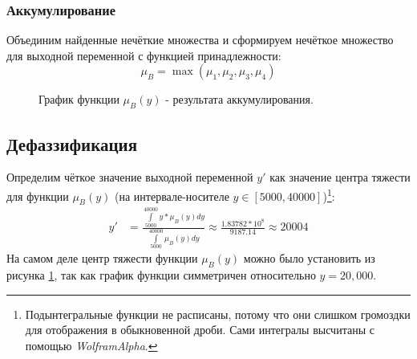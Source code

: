 \documentclass[12pt, a4paper]{article}
\begin{document}
\subsubsection{Аккумулирование}
Объединим найденные нечёткие множества и сформируем нечёткое множество для выходной переменной с функцией принадлежности:
\begin{equation*}
\mu_{B} = \max(\mu_{1}, \mu_{2}, \mu_{3}, \mu_{4})
\end{equation*}

\begin{center}
\begin{figure}[H]
\caption{График функции $\mu_{B}(y)$ - результата аккумулирования.}
\label{gr:4}
\end{figure}
\end{center}
\subsection{Дефаззификация}
Определим чёткое значение выходной переменной $y'$ как значение центра тяжести для функции $\mu_{B}(y)$ (на интервале-носителе $y\in\left[5000, 40000\right]$)\footnote{Подынтегральные функции не расписаны, потому что они слишком громоздки для отображения в обыкновенной дроби. Сами интегралы высчитаны с помощью \textit{WolframAlpha}.}:
\begin{equation*}
\begin{aligned}
y' &= \frac{ \int\limits_{5000}^{40000} y*\mu_{B}(y)dy}{\int\limits_{5000}^{40000} \mu_{B}(y)dy} \approx \frac{1.83782 * 10^8}{9187.14} \approx 20004
\end{aligned}
\end{equation*}
На самом деле центр тяжести функции $\mu_{B}(y)$ можно было установить из рисунка \ref{gr:4}, так как график функции симметричен относительно $y=20,000$.
\end{document}
